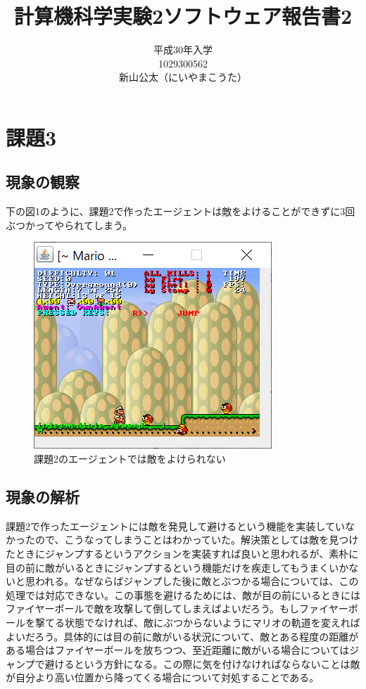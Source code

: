 \documentclass{jsarticle}
\begin{document}
\title{計算機科学実験2ソフトウェア報告書2}
\author{平成30年入学\\1029300562\\新山公太（にいやまこうた）}
\maketitle

\section{課題3}
\subsection{現象の観察}
下の図1のように、課題2で作ったエージェントは敵をよけることができずに3回ぶつかってやられてしまう。
	\begin{figure}[H]
	\includegraphics{MainTask3_failed.png}
	\caption{課題2のエージェントでは敵をよけられない}
	\end{figure}
	
\subsection{現象の解析}
課題2で作ったエージェントには敵を発見して避けるという機能を実装していなかったので、こうなってしまうことはわかっていた。解決策としては敵を見つけたときにジャンプするというアクションを実装すれば良いと思われるが、素朴に目の前に敵がいるときにジャンプするという機能だけを疾走してもうまくいかないと思われる。なぜならばジャンプした後に敵とぶつかる場合については、この処理では対応できない。この事態を避けるためには、敵が目の前にいるときにはファイヤーボールで敵を攻撃して倒してしまえばよいだろう。もしファイヤーボールを撃てる状態でなければ、敵にぶつからないようにマリオの軌道を変えればよいだろう。具体的には目の前に敵がいる状況について、敵とある程度の距離がある場合はファイヤーボールを放ちつつ、至近距離に敵がいる場合についてはジャンプで避けるという方針になる。この際に気を付けなければならないことは敵が自分より高い位置から降ってくる場合について対処することである。
\end{document}
